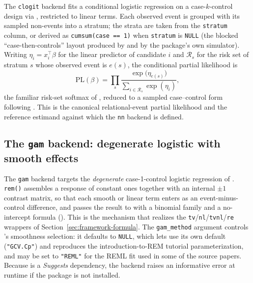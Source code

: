 The \texttt{clogit} backend fits a conditional logistic regression on a
case-$k$-control design via , restricted to linear
terms. Each observed event is grouped with its sampled non-events into a
stratum; the strata are taken from the \texttt{stratum} column, or derived as
\texttt{cumsum(case == 1)} when \texttt{stratum} is \texttt{NULL} (the blocked
``case-then-controls'' layout produced by  and by the package's
own simulator). Writing $\eta_i = x_i^{\top}\beta$ for the linear predictor of
candidate $i$ and $\mathcal{R}_s$ for the risk set of stratum $s$ whose observed
event is $e(s)$, the conditional partial likelihood is
\begin{equation}
  \label{eq:cl-partial-likelihood}
  \mathrm{PL}(\beta)
  = \prod_{s} \frac{\exp\!\big(\eta_{e(s)}\big)}
                   {\sum_{i \in \mathcal{R}_s} \exp(\eta_i)},
\end{equation}
the familiar risk-set softmax of \citet{butts2008}, reduced to a sampled
case--control form following \citet{lerner2020}. This is the canonical
relational-event partial likelihood and the reference estimand against which
the \texttt{nn} backend is defined.

\subsection{The \texttt{gam} backend: degenerate logistic with smooth effects}
\label{sec:framework-gam}

The \texttt{gam} backend targets the \emph{degenerate} case-1-control logistic
regression of \citet{boschi2025rhem}. \texttt{rem()} assembles a response of
constant ones together with an internal $\pm 1$ contrast matrix, so that each
smooth or linear term enters as an event-minus-control difference, and passes
the result to  with a binomial family and a no-intercept
formula (). This is the mechanism that
realizes the \texttt{tv}/\texttt{nl}/\texttt{tvnl}/\texttt{re} wrappers of
Section~\ref{sec:framework-formula}. The \texttt{gam\_method} argument controls
's smoothness selection: it defaults to \texttt{NULL}, which lets
 use its own default (\texttt{"GCV.Cp"}) and reproduces the
introduction-to-REM tutorial parameterization, and may be set to \texttt{"REML"}
for the REML fit used in some of the source papers. Because  is a
\emph{Suggests} dependency, the backend raises an informative error at runtime
if the package is not installed.

